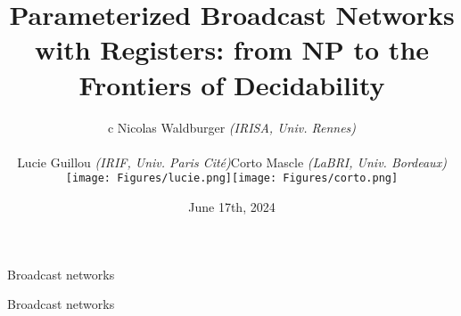 \documentclass{beamer}
\begin{document}
	\title[Param. Broadcast Networks with
Registers]{Parameterized Broadcast Networks with
Registers: from NP to the Frontiers of
Decidability}
	\date[]{June 17th, 2024\vspace{-0.5cm}}
\author[Nicolas Waldburger]{\begin{tabular}{c} Nicolas Waldburger \textit{\scriptsize(IRISA, Univ. Rennes)} \\
		 \begin{tabular}{ccc}
		Lucie Guillou  \textit{\scriptsize(IRIF, Univ. Paris Cité)} & Corto Mascle  \textit{\scriptsize{(LaBRI, Univ. Bordeaux)}} \\
		\texttt{[image: Figures/lucie.png]} & \texttt{[image: Figures/corto.png]} 	\end{tabular} \end{tabular} \vspace{-0.3cm}}
%	
%	
\begin{frame} 	
	\titlepage
\end{frame}	



\begin{frame}{Broadcast networks}
	\centering
	
\end{frame}


\begin{frame}{Broadcast networks}
	\centering
	
\end{frame}
\end{document}
